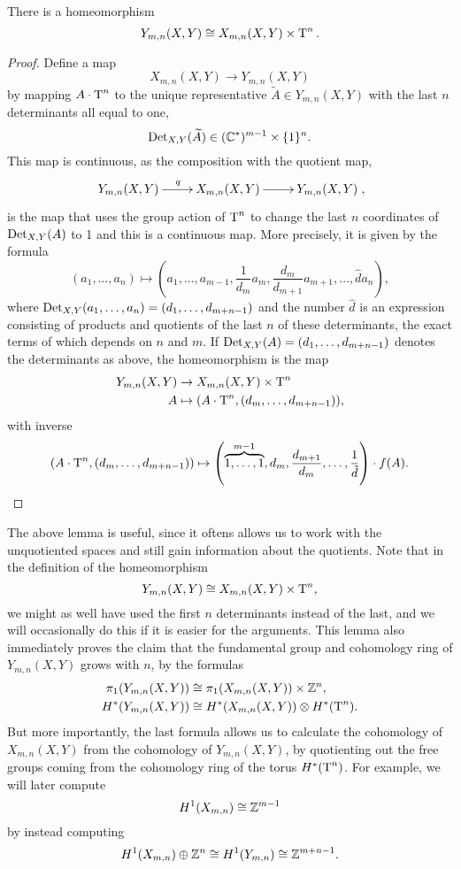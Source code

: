 \begin{lemma}
  \label{lem:reduktion}
  There is a homeomorphism
  \[ Y_{m,n}(X,Y) \cong X_{m,n}(X,Y) \times \operatorname{T}^n. \]
\end{lemma}
\begin{proof}
  Define a map
  \[ X_{m,n}(X,Y) \to Y_{m,n}(X,Y) \]
  by mapping $A\cdot \operatorname{T}^n$ to the unique representative
  $\widetilde{A} \in Y_{m,n}(X,Y)$ with the last
  $n$ determinants all equal to one,
  \[ \operatorname{Det}_{X,Y}(\widetilde{A}) \in (\mathbb{C}^*)^{m-1} \times
  \{1\}^n. \]
  This map is continuous, as the composition with the quotient map,
  \[ \xymatrix{Y_{m,n}(X,Y) \ar[r]^q & X_{m,n}(X,Y) \ar[r] &
    Y_{m,n}(X,Y)}, \]
  is the map that uses the group action of $\operatorname{T}^n$ to change the last
  $n$ coordinates of $\operatorname{Det}_{X,Y}(A)$ to 1 and this is a continuous
  map. More precisely, it is given by the formula
  \[ (a_1,\dots,a_n) \mapsto \left(a_1,\dots,a_{m-1},\frac{1}{d_m}a_m,
    \frac{d_m}{d_{m+1}} a_{m+1},\dots,\hat{d}a_n\right), \]
  where $\operatorname{Det}_{X,Y}(a_1,\dots,a_n) = (d_1,\dots,d_{m+n-1})$ and the
  number $\hat{d}$ is an expression consisting of products and
  quotients of the last $n$ of these
  determinants, the exact terms of which depends on $n$ and $m$. If
  $\operatorname{Det}_{X,Y}(A) = (d_1,\dots,d_{m+n-1})$ denotes the determinants as
  above, the homeomorphism is the map
  \begin{align*}
    Y_{m,n}(X,Y) &\to X_{m,n}(X,Y) \times \operatorname{T}^n\\
    A &\mapsto (A\cdot \operatorname{T}^n, (d_m,\dots,d_{m+n-1})),
  \end{align*}
  with inverse
  \[ (A\cdot \operatorname{T}^n, (d_m,\dots, d_{m+n-1})) \mapsto
  \left(\overbrace{1,\dots,1}^{m-1},d_m,\frac{d_{m+1}}{d_m},\dots,
    \frac{1}{\hat{d}}\right) \cdot f(A). \]
\end{proof}

The above lemma is useful, since it oftens allows us to work with the
unquotiented spaces and still gain information about the
quotients. Note that in the definition of the homeomorphism
\[ Y_{m,n}(X,Y) \cong X_{m,n}(X,Y) \times \operatorname{T}^n , \]
we might as well have
used the first $n$ determinants instead of the last, and we will
occasionally do this if it is easier for the arguments. 
This lemma also immediately proves the claim that the fundamental
group and cohomology ring of $Y_{m,n}(X,Y)$ grows with $n$, by the
formulas
\begin{align*}
  \pi_1(Y_{m,n}(X,Y)) &\cong \pi_1(X_{m,n}(X,Y)) \times \mathbb{Z}^n, \\
  H^*(Y_{m,n}(X,Y)) &\cong H^*(X_{m,n}(X,Y)) \otimes H^*(\operatorname{T}^n).
\end{align*}
But more importantly, the last formula allows us to calculate the
cohomology of $X_{m,n}(X,Y)$ from the cohomology of $Y_{m,n}(X,Y)$, by
quotienting out the free groups coming from the cohomology ring of the
torus $H^*(\operatorname{T}^n)$. For example, we will later compute 
\[ H^1(X_{m,n}) \cong \mathbb{Z}^{m-1} \]
by instead computing
\[ H^1(X_{m,n}) \oplus \mathbb{Z}^n \cong H^1(Y_{m,n}) \cong \mathbb{Z}^{m+n-1}. \]

